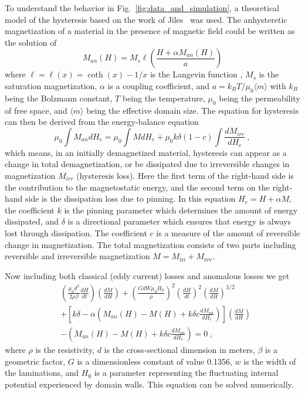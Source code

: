 To understand the behavior in Fig.~\ref{fig:data_and_simulation}, a
theoretical model of the hysteresis based on the work of
Jiles~\cite{jiles1994frequency} was used.
The anhysteretic magnetization of a material in the presence of
magnetic field could be written as the solution of
\begin{equation}
M_{an}(H) =  M_s \ell \left( \frac{H + \alpha M_{an}(H)}{a} \right)
\end{equation}
where $\ell = \ell(x)= \coth(x) - 1/x$ is the Langevin function ,
$M_s$ is the saturation magnetization, $\alpha$ is a coupling
coefficient, and $a = k_BT/\mu_0 \langle m \rangle $ with $k_B$ being the Bolzmann
constant, $T$ being the temperature, $\mu_0$ being the permeability of
free space, and $\langle m \rangle$ being the effective domain size. The equation
for hysteresis can then be derived from the energy-balance equation
\begin{equation}
\mu_0 \int M_{an} dH_e  = \mu_0 \int M dH_e + \mu_0 k \delta(1-c) \int \frac{dM_{irr}}{dH_e}~,
\end{equation}
which means, in an initially demagnetized material, hysteresis can
appear as a change in total demagnetization, or be dissipated due to
irreversible changes in magnetization $M_{irr}$ (hysteresis
loss). Here the first term of the right-hand side is the contribution
to the magnetostatic energy, and the second term on the right-hand
side is the dissipation loss due to pinning. In this equation
$H_e= H + \alpha M$, the coefficient $k$ is the pinning parameter
which determines the amount of energy dissipated, and $\delta$ is a
directional parameter which ensures that energy is always lost through
dissipation. The coefficient $c$ is a measure of the amount of
reversible change in magnetization.  The total magnetization consists
of two parts including reversible and irreversible magnetization
$M = M_{\mathrm{irr}} + M_{\mathrm{rev}}$.

Now including both classical (eddy current) losses and anomalous
losses we get
\begin{equation}
  \begin{aligned}
    &\left (  \frac{\mu_0d^2}{2 \rho \beta} \frac{dH}{dt} \right)\left( \frac{dM}{dH} \right)+ \left (\frac{GdW\mu_0 H_0}{\rho} \right)^2 \left( \frac{dH}{dt} \right)^2 \left( \frac{dM}{dH} \right)^{3/2} \\
    &+ \left[k\delta - \alpha \left( M_{an}(H) - M(H) + k \delta c \frac{dM_{an}}{dH_e}\right)\right] \left( \frac{dM}{dH} \right) \\
    &- \left(M_{an}(H) - M(H) + k \delta c\frac{dM_{an}}{dH_e} \right) = 0~,
  \end{aligned}
\end{equation}
where $\rho$ is the resistivity, $d$ is the cross-sectional dimension
in meters, $\beta$ is a geometric factor, $G$ is a dimensionless
constant of value 0.1356, $w$ is the width of the laminations, and $H_0$
is a parameter representing the fluctuating internal potential
experienced by domain walls. This equation can be solved numerically.



